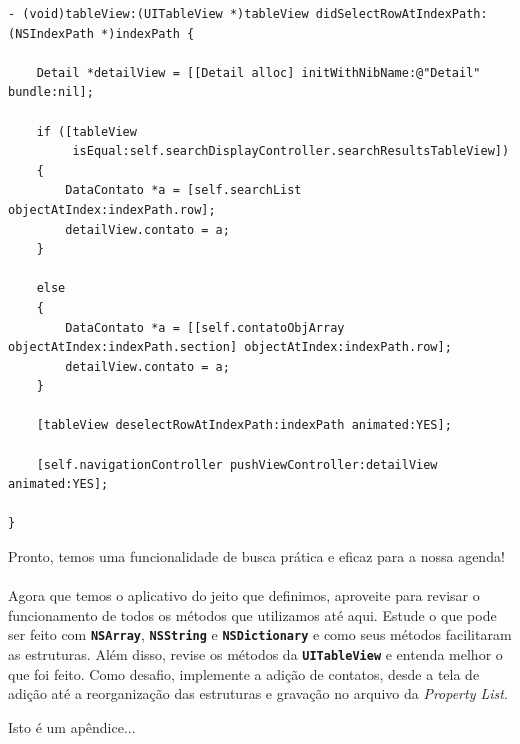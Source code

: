 \documentclass[a4paper,12pt,brazil,doubleside]{book}
\begin{document}
\begin{listing}
\begin{verbatim}
- (void)tableView:(UITableView *)tableView didSelectRowAtIndexPath:(NSIndexPath *)indexPath {

    Detail *detailView = [[Detail alloc] initWithNibName:@"Detail" bundle:nil];
    
    if ([tableView
         isEqual:self.searchDisplayController.searchResultsTableView])
    {
        DataContato *a = [self.searchList objectAtIndex:indexPath.row];
        detailView.contato = a;
    }

    else
    {
        DataContato *a = [[self.contatoObjArray objectAtIndex:indexPath.section] objectAtIndex:indexPath.row];
        detailView.contato = a;
    }
    
    [tableView deselectRowAtIndexPath:indexPath animated:YES];
    
    [self.navigationController pushViewController:detailView animated:YES];
    
}
\end{verbatim}
\end{listing}

Pronto, temos uma funcionalidade de busca prática e eficaz para a nossa agenda!
\paragraph{}Agora que temos o aplicativo do jeito que definimos, aproveite para revisar o funcionamento de todos os métodos que utilizamos até aqui. Estude o que pode ser feito com \texttt{\textbf{NSArray}}, \texttt{\textbf{NSString}} e \texttt{\textbf{NSDictionary}} e como seus métodos facilitaram as estruturas. Além disso, revise os métodos da \texttt{\textbf{UITableView}} e entenda melhor o que foi feito. Como desafio, implemente a adição de contatos, desde a tela de adição até a reorganização das estruturas e gravação no arquivo da \emph{Property List}.

\bigskip
\bigskip



\singlespace
{}
\cleardoublepage
\thispagestyle{empty}
{}


\doublespace


\appendix
{} %

Isto é um apêndice...

\end{document}
